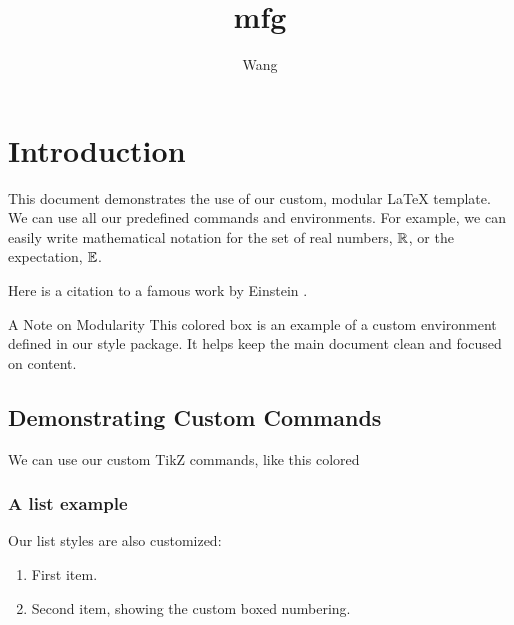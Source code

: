 \documentclass{e_class_note}
\begin{document}
\author{Wang}
\title{mfg}

\maketitle
\mytoc

\chapter{Introduction}

This document demonstrates the use of our custom, modular \LaTeX{} template. 
We can use all our predefined commands and environments. For example, we can easily write mathematical notation for the set of real numbers, $\mathbb{R}$, or the expectation, $\mathbb{E}$.

Here is a citation to a famous work by Einstein \cite{einstein1905}.

\begin{special_columns}{A Note on Modularity}
    This colored box is an example of a custom environment defined in our style package. It helps keep the main document clean and focused on content.
\end{special_columns}

\section{Demonstrating Custom Commands}

We can use our custom TikZ commands, like this colored 

\subsection{A list example}
Our list styles are also customized:
\begin{enumerate}
    \item First item.
    \item Second item, showing the custom boxed numbering.
\end{enumerate}
\end{document}
